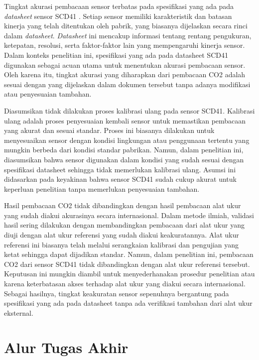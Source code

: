     Tingkat akurasi pembacaan sensor terbatas pada spesifikasi yang ada pada \textit{datasheet} sensor SCD41 \cite{scd4x_datasheet}. Setiap sensor memiliki karakteristik dan batasan kinerja yang telah ditentukan oleh pabrik, yang biasanya dijelaskan secara rinci dalam \textit{datasheet}. \textit{Datasheet} ini mencakup informasi tentang rentang pengukuran, ketepatan, resolusi, serta faktor-faktor lain yang mempengaruhi kinerja sensor. Dalam konteks penelitian ini, spesifikasi yang ada pada datasheet SCD41 digunakan sebagai acuan utama untuk menentukan akurasi pembacaan sensor. Oleh karena itu, tingkat akurasi yang diharapkan dari pembacaan CO2 adalah sesuai dengan yang dijelaskan dalam dokumen tersebut tanpa adanya modifikasi atau penyesuaian tambahan.

    Diasumsikan tidak dilakukan proses kalibrasi ulang pada sensor SCD41. Kalibrasi ulang adalah proses penyesuaian kembali sensor untuk memastikan pembacaan yang akurat dan sesuai standar. Proses ini biasanya dilakukan untuk menyesuaikan sensor dengan kondisi lingkungan atau penggunaan tertentu yang mungkin berbeda dari kondisi standar pabrikan. Namun, dalam penelitian ini, diasumsikan bahwa sensor digunakan dalam kondisi yang sudah sesuai dengan spesifikasi datasheet sehingga tidak memerlukan kalibrasi ulang. Asumsi ini didasarkan pada keyakinan bahwa sensor SCD41 sudah cukup akurat untuk keperluan penelitian tanpa memerlukan penyesuaian tambahan.
    
    Hasil pembacaan CO2 tidak dibandingkan dengan hasil pembacaan alat ukur yang sudah diakui akurasinya secara internasional. Dalam metode ilmiah, validasi hasil sering dilakukan dengan membandingkan pembacaan dari alat ukur yang diuji dengan alat ukur referensi yang sudah diakui keakuratannya. Alat ukur referensi ini biasanya telah melalui serangkaian kalibrasi dan pengujian yang ketat sehingga dapat dijadikan standar. Namun, dalam penelitian ini, pembacaan CO2 dari sensor SCD41 tidak dibandingkan dengan alat ukur referensi tersebut. Keputusan ini mungkin diambil untuk menyederhanakan prosedur penelitian atau karena keterbatasan akses terhadap alat ukur yang diakui secara internasional. Sebagai hasilnya, tingkat keakuratan sensor sepenuhnya bergantung pada spesifikasi yang ada pada datasheet tanpa ada verifikasi tambahan dari alat ukur eksternal.
    
\section{Alur Tugas Akhir}

